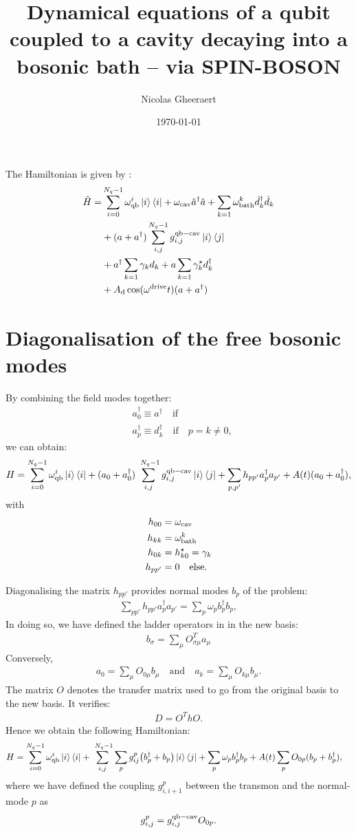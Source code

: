 \documentclass[prb]{revtex4}
\newcommand{\eq}[1]{\begin{align}#1\end{align}}
\begin{document}
\title{Dynamical equations of a qubit coupled to a cavity decaying into a bosonic bath -- via SPIN-BOSON}
\author{Nicolas Gheeraert}
\date{\today}
\maketitle
The Hamiltonian is given by :
%
\eq{
\hat H = &\sum_{i=0}^{ N_q-1} \omega_{\rm qb }^i \ket{i} \bra{i} + \omega_{\rm cav} \hat a^\dag \hat a + \sum_{k=1} \omega_{\rm bath}^k \hat d_k^\dag \hat d_k  \notag \\
&+( a+a^\dag )  \sum_{i,j}^{ N_q-1} g^{\rm qb-cav}_{i,j}  \ket{i}\bra{j} \notag \\
&+a^\dag \sum_{k=1} \gamma_k d_k+a \sum_{k=1} \gamma_k^\star d_k^\dag  \notag \\
&+A_{\rm d} \cos(\omega^{\rm drive}t) (a+a^\dag)
}

\section{ Diagonalisation of the free bosonic modes }

By combining the field modes together:
\eq{
&a_0^\dag \equiv a^\dag \quad \text{if}\\
&a_p^\dag \equiv d_k^\dag \quad \text{if}\quad  p=k \ne 0,
}
we can obtain:
\eq{
H = \sum_{i=0}^{ N_q-1} \omega_{\rm qb }^i \ket{i} \bra{i}  + ( a_0+a_0^\dag )  \sum_{i,j}^{\ N_q-1} g^{\rm qb-cav}_{i,j}\ket{i}\bra{j} + \sum_{p,p'} h_{p p'} a_p^\dag a_{p'} + A(t) (a_0+a_0^\dag) ,
}
with 
\eq{
h_{00} &= \omega_{\rm cav} \notag\\
h_{kk} &= \omega^k_{\rm bath} \notag\\
h_{0k} &= h_{k0}^\star =  \gamma_k \notag\\
h_{pp'} &= 0 \quad {\rm else}.
}

Diagonalising the matrix $h_{pp'}$ provides normal modes $b_p$ of the problem:
\eq{
\sum_{pp'} h_{pp'} a_p^\dag a_{p'} = \sum_p \omega_p b_p^\dag b_p,
}
In doing so, we have defined the ladder operators in in the new basis:
\eq{
b_\sigma = \sum_\mu O^T_{\sigma \mu} a_\mu
}
Conversely,
\eq{
a_0 = \sum_\mu O_{0\mu} b_\mu \quad \text{and} \quad a_k = \sum_\mu O_{k \mu} b_\mu.
}
The matrix $O$ denotes the transfer matrix used to go from the original basis to the new basis. It verifies:
\eq{
D = O^T h O.
}
Hence we obtain the following Hamiltonian:
\eq{
H & = \sum_{i=0}^{ N_q-1} \omega_{\rm qb }^i \ket{i} \bra{i}  + \sum_{i,j}^{\ N_q-1}  \sum_p g_{ij}^p\bigl( b_p^\dag + b_p \bigr) \ket{i}\bra{j} + \sum_{p}\omega_p b_p^\dag b_p +  A(t) \sum_p O_{0p}(b_p+b_p^\dag),
}
where we have defined the coupling $g_{i,i+1}^p$ between the transmon and the normal-mode $p$  as 
\eq{
g_{i,j}^p = g^{\rm qb-cav}_{i,j} O_{0p}.
}
\end{document}
